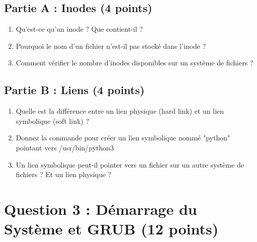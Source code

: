 \documentclass[12pt,a4paper]{article}
\begin{document}
\begin{questionbox}
\subsection*{Partie A : Inodes (4 points)}
\begin{enumerate}[label=\alph*)]
    \item Qu'est-ce qu'un inode ? Que contient-il ?
    \item Pourquoi le nom d'un fichier n'est-il pas stocké dans l'inode ?
    \item Comment vérifier le nombre d'inodes disponibles sur un système de fichiers ?
\end{enumerate}

\subsection*{Partie B : Liens (4 points)}
\begin{enumerate}[label=\alph*)]
    \item Quelle est la différence entre un lien physique (hard link) et un lien symbolique (soft link) ?
    \item Donnez la commande pour créer un lien symbolique nommé "python" pointant vers /usr/bin/python3
    \item Un lien symbolique peut-il pointer vers un fichier sur un autre système de fichiers ? Et un lien physique ?
\end{enumerate}
\end{questionbox}

\newpage


\section{Question 3 : Démarrage du Système et GRUB (12 points)}
\end{document}
